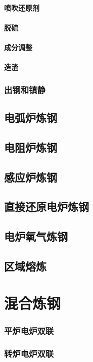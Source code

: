 \documentclass[UTF8]{../../ApplicationUniverse}
\begin{document}
            \paragraph{喷吹还原剂}
            \paragraph{脱硫}
            \paragraph{成分调整}
            \paragraph{造渣}
        \subsubsection{出钢和镇静}
    \subsection{电弧炉炼钢}
    \subsection{电阻炉炼钢}
    \subsection{感应炉炼钢}
    \subsection{直接还原电炉炼钢}
    \subsection{电炉氧气炼钢}
    \subsection{区域熔炼}
\section{混合炼钢}
    \subsubsection{平炉电炉双联}
    \subsubsection{转炉电炉双联}
\end{document}
